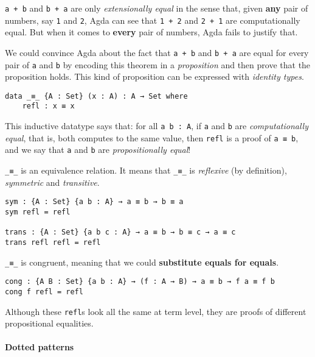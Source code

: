 \documentclass[\main/thesis.tex]{subfiles}
\begin{document}
{\lstinline|a + b|} and {\lstinline|b + a|} are only \textit{extensionally equal}
in the sense that, given \textbf{any} pair of numbers, say {\lstinline|1|} and {\lstinline|2|},
Agda can see that {\lstinline|1 + 2|} and {\lstinline|2 + 1|} are computationally equal.
But when it comes to \textbf{every} pair of numbers, Agda fails to justify that.

We could convince Agda about the fact that {\lstinline|a + b|} and {\lstinline|b + a|}
are equal for every pair of {\lstinline|a|} and {\lstinline|b|} by encoding this
theorem in a \textit{proposition} and then prove that the proposition holds.
This kind of proposition can be expressed with \textit{identity types}.

\begin{lstlisting}
data _≡_ {A : Set} (x : A) : A → Set where
    refl : x ≡ x
\end{lstlisting}

This inductive datatype says that: for all {\lstinline|a b : A|},
if {\lstinline|a|} and {\lstinline|b|} are \textit{computationally equal},
that is, both computes to the same value,
then {\lstinline|refl|} is a proof of {\lstinline|a ≡ b|},
and we say that {\lstinline|a|} and {\lstinline|b|} are \textit{propositionally equal}!

{\lstinline|_≡_|} is an equivalence relation. It means that {\lstinline|_≡_|}
is \textit{reflexive} (by definition), \textit{symmetric} and \textit{transitive}.

\begin{lstlisting}
sym : {A : Set} {a b : A} → a ≡ b → b ≡ a
sym refl = refl

trans : {A : Set} {a b c : A} → a ≡ b → b ≡ c → a ≡ c
trans refl refl = refl
\end{lstlisting}

{\lstinline|_≡_|} is congruent, meaning that we could \textbf{substitute equals for equals}.

\begin{lstlisting}
cong : {A B : Set} {a b : A} → (f : A → B) → a ≡ b → f a ≡ f b
cong f refl = refl
\end{lstlisting}

Although these {\lstinline|refl|}s look all the same at term level,
they are proofs of different propositional equalities.

\paragraph{Dotted patterns}
\end{document}

